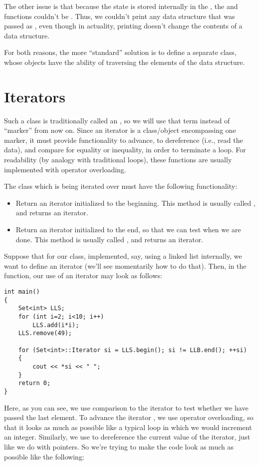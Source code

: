 The other issue is that because the state is stored internally in the
, the  and  functions couldn't be
. Thus, we couldn't print any data structure that was
passed as , even though in actuality, printing doesn't
change the contents of a data structure.

For both reasons, the more ``standard'' solution is to define a
separate class, whose objects have the ability of traversing 
the elements of the data structure. 

\section{Iterators}
Such a class is traditionally called an , so we will
use that term instead of ``marker'' from now on. 
Since an iterator is a class/object encompassing one marker, it must
provide functionality to advance, to dereference (i.e., read the
data), and compare for equality or inequality, in order to terminate a
loop.
For readability (by analogy with traditional  loops), these
functions are usually implemented with operator overloading.

The class which is being iterated over must have the following
functionality:
\begin{itemize}
\item Return an iterator initialized to the beginning.
  This method is usually called , and returns an iterator.
\item Return an iterator initialized to the end, so that we can test
  when we are done. This method is usually called , and
  returns an iterator.
\end{itemize}

Suppose that for our  class, implemented, say, using a
linked list internally, we want to define an iterator
 (we'll see momentarily how to do that).
Then, in the  function, our use of an iterator may look
as follows:

\begin{verbatim}
int main()
{
    Set<int> LLS;
    for (int i=2; i<10; i++)
        LLS.add(i*i);
    LLS.remove(49);

    for (Set<int>::Iterator si = LLS.begin(); si != LLB.end(); ++si)
    { 
        cout << *si << " ";
    }
    return 0; 
}
\end{verbatim}

Here, as you can see, we use comparison to the  iterator
to test whether we have passed the last element. 
To advance the iterator , we use operator overloading, so
that it looks as much as possible like a typical loop in which we would
increment an integer. Similarly, we use  to dereference the
current value of the iterator, just like we do with pointers.
So we're trying to make the code look as much as possible like the
following:

